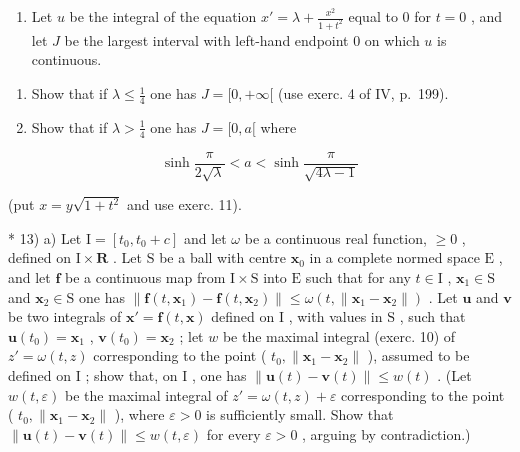 \begin{enumerate}
\def\labelenumi{\arabic{enumi})}
\setcounter{enumi}{11}
\tightlist
\item
  Let \(u\) be the integral of the equation \(x' = \lambda + \frac{x^2}{1 + t^2}\) equal to 0 for \(t = 0\) , and let \(J\) be the largest interval with left-hand endpoint 0 on which \(u\) is continuous.
\end{enumerate}

\begin{enumerate}
\def\labelenumi{\alph{enumi})}
\item
  Show that if \(\lambda \leqslant \frac{1}{4}\) one has \(J = [0, +\infty[\) (use exerc. 4 of IV, p.~199).
\item
  Show that if \(\lambda >\frac{1}{4}\) one has \(J = [0,a[\) where
\end{enumerate}

\[
\sinh \frac {\pi}{2 \sqrt {\lambda}} <   a <   \sinh \frac {\pi}{\sqrt {4 \lambda - 1}}
\]

(put \(x = y\sqrt{1 + t^{2}}\) and use exerc. 11).

* 13) a) Let \(\mathrm{I} = [t_0, t_0 + c]\) and let \(\omega\) be a continuous real function, \(\geqslant 0\) , defined on \(\mathrm{I} \times \mathbf{R}\) . Let \(\mathrm{S}\) be a ball with centre \(\mathbf{x}_0\) in a complete normed space \(\mathrm{E}\) , and let \(\mathbf{f}\) be a continuous map from \(\mathrm{I} \times \mathrm{S}\) into \(\mathrm{E}\) such that for any \(t \in \mathrm{I}\) , \(\mathbf{x}_1 \in \mathrm{S}\) and \(\mathbf{x}_2 \in \mathrm{S}\) one has \(\| \mathbf{f}(t, \mathbf{x}_1) - \mathbf{f}(t, \mathbf{x}_2) \| \leqslant \omega(t, \| \mathbf{x}_1 - \mathbf{x}_2 \|)\) . Let \(\mathbf{u}\) and \(\mathbf{v}\) be two integrals of \(\mathbf{x}' = \mathbf{f}(t, \mathbf{x})\) defined on \(\mathrm{I}\) , with values in \(\mathrm{S}\) , such that \(\mathbf{u}(t_0) = \mathbf{x}_1\) , \(\mathbf{v}(t_0) = \mathbf{x}_2\) ; let \(w\) be the maximal integral (exerc. 10) of \(z' = \omega(t, z)\) corresponding to the point ( \(t_0, \| \mathbf{x}_1 - \mathbf{x}_2 \|\) ), assumed to be defined on \(\mathrm{I}\) ; show that, on \(\mathrm{I}\) , one has \(\| \mathbf{u}(t) - \mathbf{v}(t) \| \leqslant w(t)\) . (Let \(w(t, \varepsilon)\) be the maximal integral of \(z' = \omega(t, z) + \varepsilon\) corresponding to the point ( \(t_0, \| \mathbf{x}_1 - \mathbf{x}_2 \|\) ), where \(\varepsilon > 0\) is sufficiently small. Show that \(\| \mathbf{u}(t) - \mathbf{v}(t) \| \leqslant w(t, \varepsilon)\) for every \(\varepsilon > 0\) , arguing by contradiction.)

